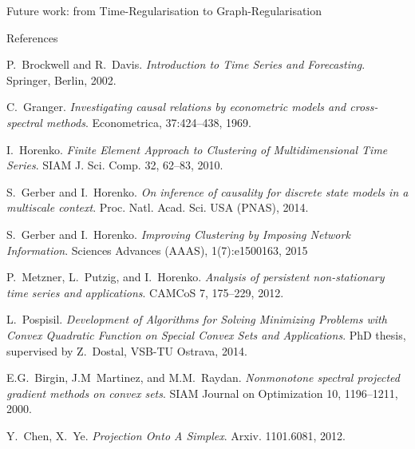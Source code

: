 \documentclass[final,hyperref={pdfpagelabels=false}]{beamer}
\begin{document}
\begin{frame}[t]
\begin{columns}[t]
\begin{column}{.48\textwidth}
\begin{block}{Future work: from Time-Regularisation to Graph-Regularisation}
\end{block}





\begin{block}{References}
        
\nocite{*} %
\small{



%

\begin{thebibliography}{}

P.~Brockwell and R.~Davis.
{\em Introduction to Time Series and Forecasting}.
Springer, Berlin, 2002.

C.~Granger.
{\em Investigating causal relations by econometric models and cross-spectral methods}.
Econometrica, 37:424--438, 1969.

I.~Horenko.
{\em Finite Element Approach to Clustering of Multidimensional Time Series}.
SIAM J. Sci. Comp. 32, 62--83, 2010.

S.~Gerber and I.~Horenko.
{\em On inference of causality for discrete state models in a multiscale context}.
Proc. Natl. Acad. Sci. USA (PNAS), 2014.

S.~Gerber and I.~Horenko.
{\em Improving Clustering by Imposing Network Information}.
Sciences Advances (AAAS), 1(7):e1500163, 2015


P.~Metzner, L.~Putzig, and I.~Horenko.
{\em Analysis of persistent non-stationary time series and applications}.
 CAMCoS 7, 175--229, 2012.

L.~Pospisil.
{\em Development of Algorithms for Solving Minimizing Problems
with Convex Quadratic Function on Special Convex Sets and Applications}.
PhD thesis, supervised by Z.~Dostal, VSB-TU Ostrava, 2014.

E.G.~Birgin, J.M~Martinez, and M.M.~Raydan.
{\em Nonmonotone spectral projected gradient methods on convex sets}. 
SIAM Journal on Optimization 10, 1196--1211, 2000.

Y.~Chen, X.~Ye.
{\em Projection Onto A Simplex}.
Arxiv. 1101.6081, 2012.



\end{thebibliography}}
\end{block}
\end{column}
\end{columns}
\end{frame}
\end{document}

